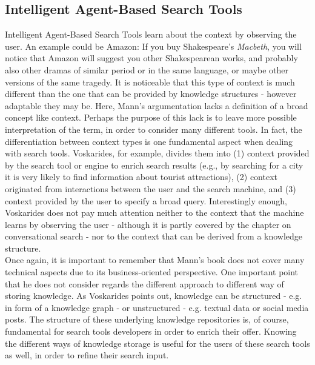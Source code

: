 \subsection{Intelligent Agent-Based Search Tools}
Intelligent Agent-Based Search Tools learn about the context by observing the user. An example could be Amazon: If you buy Shakespeare's \textit{Macbeth}, you will notice that Amazon will suggest you other Shakespearean works, and probably also other dramas of similar period or in the same language, or maybe other versions of the same tragedy. It is noticeable that this type of context is much different than the one that can be provided by knowledge structures - however adaptable they may be. Here, Mann's argumentation lacks a definition of a broad concept like context. Perhaps the purpose of this lack is to leave more possible interpretation of the term, in order to consider many different tools. In fact, the differentiation between context types is one fundamental aspect when dealing with search tools. Voskarides, for example, divides them into (1) context provided by the search tool or engine to enrich search results (e.g., by searching for a city it is very likely to find information about tourist attractions), (2) context originated from interactions between the user and the search machine, and (3) context provided by the user to specify a broad query. \cite{voskarides} Interestingly enough, Voskarides does not pay much attention neither to the context that the machine learns by observing the user - although it is partly covered by the chapter on conversational search - nor to the context that can be derived from a knowledge structure.
\\
Once again, it is important to remember that Mann's book does not cover many technical aspects due to its business-oriented perspective. One important point that he does not consider regards the different approach to different way of storing knowledge. As Voskarides points out, knowledge can be structured - e.g. in form of a knowledge graph - or unstructured - e.g. textual data or social media posts. \cite{voskarides} The structure of these underlying knowledge repositories is, of course, fundamental for search tools developers in order to enrich their offer. Knowing the different ways of knowledge storage is useful for the users of these search tools as well, in order to refine their search input. 
\newpage
